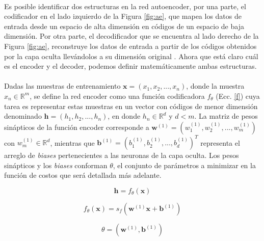 \documentclass[a4paper,12pt]{article}
\begin{document}
\paragraph{}
Es posible identificar dos estructuras en la red autoencoder, por una parte, el codificador en el lado izquierdo de la Figura \ref{fig:ae}, que mapea los datos de entrada desde un espacio de alta dimensión en códigos de un espacio de baja dimensión. Por otra parte, el decodificador que se encuentra al lado derecho de la Figura \ref{fig:ae}, reconstruye los datos de entrada a partir de los códigos obtenidos por la capa oculta llevándolos a su dimensión original \cite{shao}. Ahora que está claro cuál es el encoder y el decoder, podemos definir matemáticamente ambas estructuras.

\paragraph{}
Dadas las muestras de entrenamiento $\textbf{x}=(x_{1},x_{2},...,x_{n})$, donde la muestra $x_{n}\in \mathbb{R}^{m}$, se define la red encoder como una función codificadora $f_{\theta}$ (Ecc. \ref{f}) cuya tarea es representar estas muestras en un vector con códigos de menor dimensión denominado $\textbf{h}=(h_{1},h_{2},...,h_{n})$, en donde $h_{n} \in \mathbb{R}^{d}$ y $d<m$. La matriz de pesos sinápticos de la función encoder corresponde a $\textbf{w}^{(1)} = (w_{1}^{(1)},w_{2}^{(1)},...,w_{m}^{(1)})$ con $w_{m}^{(1)}\in \mathbb{R}^{d}$, mientras que $\textbf{b}^{(1)}=(b_{1}^{(1)},b_{2}^{(1)},...,b_{d}^{(1)})^T$ representa el arreglo de \textit{biases} pertenecientes a las neuronas de la capa oculta. Los pesos sinápticos y los \textit{biases} conforman $\theta$, el conjunto de parámetros a minimizar en la función de costos que será detallada más adelante.

\begin{equation}
\label{h}
\textbf{h}=f_{\theta}(\textbf{x})
\end{equation}

\begin{equation}
\label{f}
f_{\theta}(\textbf{x})=s_{f}(\textbf{w}^{(1)}\textbf{x}+\textbf{b}^{(1)})
\end{equation}

\begin{equation}
\label{teta1}
\theta=(\textbf{w}^{(1)},\textbf{b}^{(1)})
\end{equation}
\end{document}
